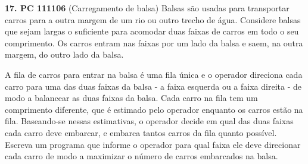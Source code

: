 

\noindent \textbf{17. PC 111106} (Carregamento de balsa) Balsas são usadas para transportar carros para a outra margem de um rio ou outro trecho de água. Considere balsas que sejam largas o suficiente para acomodar duas faixas de carros em todo o seu comprimento. Os carros entram nas faixas por um lado da balsa e saem, na outra margem, do outro lado da balsa.

A fila de carros para entrar na balsa é uma fila única e o operador direciona cada carro para uma das duas faixas da balsa - a faixa esquerda ou a faixa direita - de modo a balancear as duas faixas da balsa. Cada carro na fila tem um comprimento diferente, que é estimado pelo operador enquanto os carros estão na fila. Baseando-se nessas estimativas, o operador decide em qual das duas faixas cada carro deve embarcar, e embarca tantos carros da fila quanto possível. Escreva um programa que informe o operador para qual faixa ele deve direcionar cada carro de modo a maximizar o número de carros embarcados na balsa.\\[6pt]